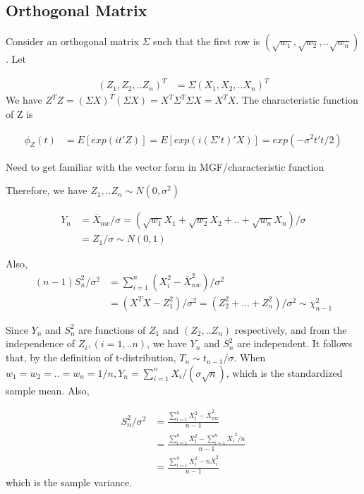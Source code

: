 \documentclass[11pt]{article} %
\begin{document}
\subsection{Orthogonal Matrix}

Consider an orthogonal matrix $\Sigma$ such that the first row is $(\sqrt{w_1}, \sqrt{w_2},.. \sqrt{w_n})$. Let

\begin{align*}
	(Z_1, Z_2,.. Z_n)^T &= \Sigma  (X_1, X_2,.. X_n)^T
\end{align*}
We have $Z^T Z = (\Sigma X)^T (\Sigma X) = X^T \Sigma^T \Sigma X = X^T X$. The characteristic function of Z is 

\begin{align*}
	\phi_Z(t) &= E[exp(i t'Z)] = E[exp(i (\Sigma' t)' X)] = exp(-\sigma^2 t't/2)
\end{align*}

Need to get familiar with the vector form in MGF/characteristic function

Therefore, we have $Z_1, .. Z_n \sim N(0, \sigma^2)$ 

\begin{align*}
	Y_n &= \bar{X}_{nw}/\sigma = (\sqrt{w_1} X_1 + \sqrt{w_2} X_2 + .. + \sqrt{w_n} X_n)/\sigma\\
	&= Z_1/\sigma \sim N(0,1)
\end{align*}

Also, 
\begin{align*}
	(n-1) S_n^2/\sigma^2 &= \sum_{i=1}^n (X_i^2 - \bar{X}_{nw}^2)/\sigma^2 \\
	&= (X^T X - Z_1^2)/\sigma^2 = (Z_2^2 + ... + Z_n^2)/\sigma^2 \sim \chi^2_{n-1}
\end{align*}

Since $Y_n$ and $S_n^2$ are functions of $Z_1$ and $(Z_2,.. Z_n)$ respectively, and from the independence of $Z_i, (i=1,..n)$, we have $Y_n$ and $S_n^2$ are independent. It follows that, by the definition of t-distribution, $T_n \sim t_{n-1}/\sigma$. When $w_1=w_2=..=w_n=1/n, Y_n = \sum_{i=1}^n X_i/(\sigma \sqrt{n})$, which is the standardized sample mean. Also,

\begin{align*}
	S_n^2/\sigma^2 &= \frac{\sum_{i=1}^n X_i^2 - \bar{X}_{nw}^2 }{n-1} \\
	&= \frac{\sum_{i=1}^n X_i^2 - {\sum_{i=1}^n X_i}^2/n }{n-1}\\
	&= \frac{\sum_{i=1}^n X_i^2 -  n\bar{X}_i^2 }{n-1}
\end{align*} 	   
which is the sample variance.
\end{document}
